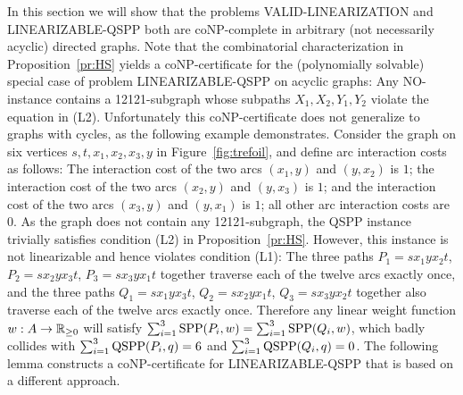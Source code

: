 In this section we will show that the problems VALID-LINEARIZATION and LI\-NEA\-RIZ\-ABLE-QSPP
both are coNP-complete in arbitrary (not necessarily acyclic) directed graphs.
Note that the combinatorial characterization in Proposition~\ref{pr:HS} yields a coNP-certificate 
for the (polynomially solvable) special case of problem LINEARIZABLE-QSPP on acyclic graphs:
Any NO-instance contains a 12121-subgraph whose subpaths $X_1,X_2,Y_1,Y_2$ violate the equation in (L2).
Unfortunately this coNP-certificate does not generalize to graphs with cycles, as the 
following example demonstrates.
Consider the graph on six vertices $s,t,x_1,x_2,x_3,y$ in Figure~\ref{fig:trefoil}, 
and define arc interaction costs as follows:
The interaction cost of the two arcs $(x_1,y)$ and $(y,x_2)$ is $1$; 
the interaction cost of the two arcs $(x_2,y)$ and $(y,x_3)$ is $1$; and
the interaction cost of the two arcs $(x_3,y)$ and $(y,x_1)$ is $1$;
all other arc interaction costs are~$0$.
As the graph does not contain any 12121-subgraph, the QSPP instance trivially satisfies 
condition (L2) in Proposition~\ref{pr:HS}.
However, this instance is not linearizable and hence violates condition (L1):
The three paths 
$P_1=sx_1yx_2t$, 
$P_2=sx_2yx_3t$,
$P_3=sx_3yx_1t$
together traverse each of the twelve arcs exactly once, and the three paths
$Q_1=sx_1yx_3t$,
$Q_2=sx_2yx_1t$,
$Q_3=sx_3yx_2t$
together also traverse each of the twelve arcs exactly once.
Therefore any linear weight function $w:A\to{\mathbb{R}_{\ge0}}$ will satisfy $\sum_{i=1}^3\text{SPP}(P_i,w)=\sum_{i=1}^3\text{SPP}(Q_i,w)$,
which badly collides with $\sum_{i=1}^3\text{QSPP}(P_i,q)=6$ and $\sum_{i=1}^3\text{QSPP}(Q_i,q)=0$.
The following lemma constructs a coNP-certificate for LINEARIZABLE-QSPP that is based on a 
different approach.

